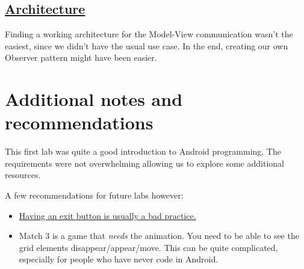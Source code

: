 \documentclass{article}
\begin{document}
\subsection{\href{https://media.tenor.co/images/bdbe70ee818da02b0b7e7e3fd390a9c0/raw}{Architecture}}

Finding a working architecture for the Model-View communication wasn't the easiest, since we didn't have the usual use case. In the end, creating our own Observer pattern might have been easier.

\section{Additional notes and recommendations}

This first lab was quite a good introduction to Android programming. The requirements were not overwhelming allowing us to explore some additional resources. 

A few recommendations for future labs however:

\begin{itemize}
\item \href{https://www.quora.com/Why-dont-Android-apps-have-an-exit-button}{Having an exit button is usually a bad practice.}
\item Match 3 is a game that \textit{needs} the animation. You need to be able to see the grid elements disappear/appear/move. This can be quite complicated, especially for people who have never code in Android.
\end{itemize}
\end{document}
